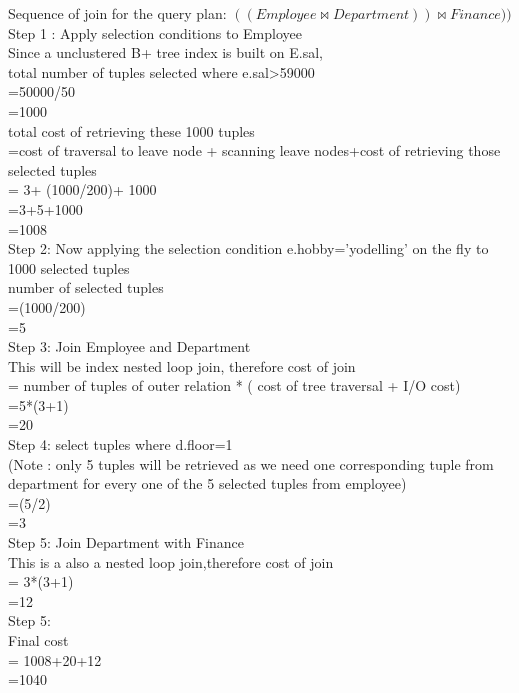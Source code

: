 \documentclass[10pt]{article}
\begin{document}
\begin{enumerate}
		Sequence of join for the query plan: $((Employee \bowtie Department))\bowtie Finance))
		$
		\\Step 1 : Apply selection conditions to Employee
		\\Since a unclustered B+ tree index is built on E.sal, 
		\\ total number of tuples selected where e.sal>59000
		\\=50000/50
		\\=1000
		\\total cost of retrieving these 1000 tuples 
		\\=cost of traversal to leave node + scanning leave nodes+cost of retrieving those selected tuples 
		\\= 3+ (1000/200)+ 1000
		\\=3+5+1000
		\\=1008
		\\Step 2: Now applying the selection condition e.hobby='yodelling' on the fly to 1000 selected tuples
		\\number of selected tuples
		\\=(1000/200)
		\\=5
		\\Step 3: Join Employee and Department
		\\This will be index nested loop join, therefore cost of join
		\\= number of tuples of outer relation * ( cost of tree traversal + I/O cost)
		\\=5*(3+1)
		\\=20
		\\Step 4: select tuples where d.floor=1
		\\(Note : only 5 tuples will be retrieved as we need one corresponding tuple from department for every one of the 5 selected tuples from employee)
		\\=(5/2)
		\\=3
		\\Step 5: Join Department with Finance
		\\This is a also a nested loop join,therefore cost of join
		\\= 3*(3+1)
		\\=12
		\\Step 5:
		\\Final cost
		\\= 1008+20+12
		\\=1040
		
		
	\end{enumerate}
	
\end{document}
